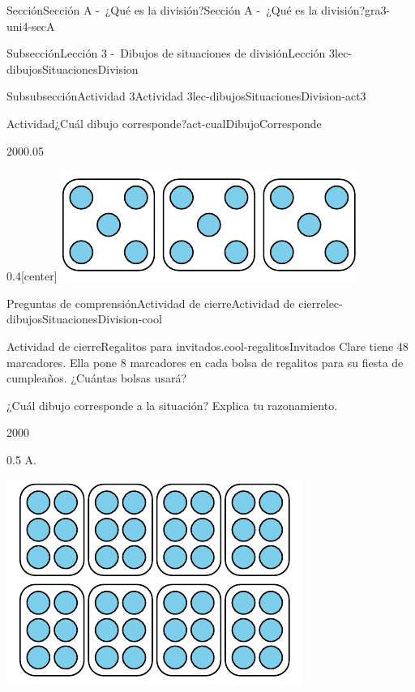 \documentclass[twoside,10pt,]{article}
\begin{document}
\begin{sectionptx}{Sección}{Sección A -~¿Qué es la división?}{}{Sección A -~¿Qué es la división?}{}{}{gra3-uni4-secA}
\begin{subsectionptx}{Subsección}{Lección 3 -~Dibujos de situaciones de división}{}{Lección 3}{}{}{lec-dibujosSituacionesDivision}
\begin{subsubsectionptx}{Subsubsección}{Actividad 3}{}{Actividad 3}{}{}{lec-dibujosSituacionesDivision-act3}
\begin{activity}{Actividad}{¿Cuál dibujo corresponde?}{act-cualDibujoCorresponde}
\begin{sidebyside}{2}{0}{0}{0.05}
\begin{sbspanel}{0.4}[center]
\includegraphics[width=\linewidth]{external/svg-source/tikz-file-149315.pdf}
\end{sbspanel}%
\end{sidebyside}%
\end{activity}%
\end{subsubsectionptx}
%
%
\typeout{************************************************}
\typeout{************************************************}
%
\begin{reading-questions-subsubsection}{Preguntas de comprensión}{Actividad de cierre}{}{Actividad de cierre}{}{}{lec-dibujosSituacionesDivision-cool}
\begin{project}{Actividad de cierre}{Regalitos para invitados.}{cool-regalitosInvitados}%
Clare tiene 48 marcadores. Ella pone 8 marcadores en cada bolsa de regalitos para su fiesta de cumpleaños. ¿Cuántas bolsas usará?%
\par
¿Cuál dibujo corresponde a la situación? Explica tu razonamiento.%
\begin{sidebyside}{2}{0}{0}{0}%
\begin{sbspanel}{0.5}%
A.%
\par
\includegraphics[width=\linewidth]{external/svg-source/tikz-file-246306.pdf}

\end{sbspanel}
\end{sidebyside}
\end{project}
\end{reading-questions-subsubsection}
\end{subsectionptx}
\end{sectionptx}
\end{document}

